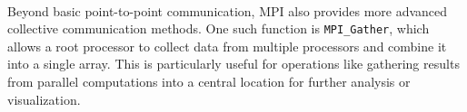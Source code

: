 \documentclass[../../main.tex]{subfiles}
\begin{document}
~\\
Beyond basic point-to-point communication, MPI also provides more advanced collective communication methods. One such function is \texttt{MPI\_Gather}, which allows a root processor to collect data from multiple processors and combine it into a single array. This is particularly useful for operations like gathering results from parallel computations into a central location for further analysis or visualization. 
\end{document}
